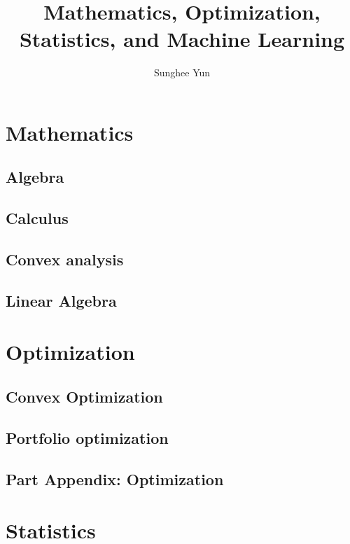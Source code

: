 \documentclass[10pt, twoside]{book}   	%
\title{Mathematics, Optimization, Statistics, and Machine Learning}
\author{Sunghee Yun}
\begin{document}
\maketitle

\setcounter{secnumdepth}{4}
\setcounter{tocdepth}{3}
\tableofcontents


\part{Mathematics}

\chapter{Algebra}


\chapter{Calculus}


\chapter{Convex analysis}


\chapter{Linear Algebra}



\part{Optimization}

\chapter{Convex Optimization}


\chapter{Portfolio optimization}


\chapter{Part Appendix: Optimization}



\part{Statistics}
%
\end{document}
